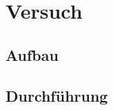 \documentclass[paper=a4]{scrartcl}
\begin{document}
\section{Versuch}
\subsection{Aufbau}
\subsection{Durchführung}
\end{document}
